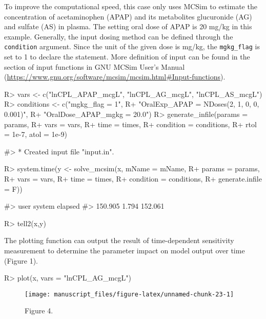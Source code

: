 \documentclass[article]{jss}
\begin{document}
To improve the computational speed, this case only uses MCSim to
estimate the concentration of acetaminophen (APAP) and its metabolites
glucuronide (AG) and sulfate (AS) in plasma. The setting oral dose of
APAP is 20 mg/kg in this example. Generally, the input dosing method can
be defined through the \texttt{condition} argument. Since the unit of
the given dose is mg/kg, the \texttt{mgkg\_flag} is set to 1 to declare
the statement. More definition of input can be found in the section of
input functions in GNU MCSim User's Manual
(\url{https://www.gnu.org/software/mcsim/mcsim.html\#Input-functions}).

\begin{CodeChunk}

\begin{CodeInput}
R> vars <- c("lnCPL_APAP_mcgL", "lnCPL_AG_mcgL", "lnCPL_AS_mcgL")
R> conditions <- c("mgkg_flag = 1",
R+                 "OralExp_APAP = NDoses(2, 1, 0, 0, 0.001)",
R+                 "OralDose_APAP_mgkg = 20.0")
R> generate_infile(params = params,
R+                 vars = vars,
R+                 time = times, 
R+                 condition = conditions,
R+                 rtol = 1e-7, atol = 1e-9)
\end{CodeInput}

\begin{CodeOutput}
#> * Created input file "input.in".
\end{CodeOutput}

\begin{CodeInput}
R> system.time(y <- solve_mcsim(x, mName = mName, 
R+                              params = params,
R+                              vars = vars,
R+                              time = times,
R+                              condition = conditions,
R+                              generate.infile = F))
\end{CodeInput}

\begin{CodeOutput}
#>    user  system elapsed 
#> 150.905   1.794 152.061
\end{CodeOutput}

\begin{CodeInput}
R> tell2(x,y)
\end{CodeInput}
\end{CodeChunk}

The plotting function can output the result of time-dependent
sensitivity measurement to determine the parameter impact on model
output over time (Figure 1).

\begin{CodeChunk}

\begin{CodeInput}
R> plot(x, vars = "lnCPL_AG_mcgL")
\end{CodeInput}
\begin{figure}

{\centering \texttt{[image: manuscript\_files/figure-latex/unnamed-chunk-23-1]} 

}

\caption[Figure 4]{Figure 4. }\label{fig:unnamed-chunk-23}
\end{figure}
\end{CodeChunk}
\end{document}
